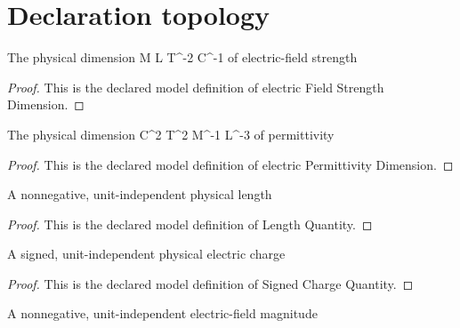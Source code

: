 \section{Declaration topology}
\begin{definition}
  \label{def:physics:phyx-mini-0852:phyxminiproblems-problemphyxmini0852-electricfieldstrengthdimension}
  The physical dimension M L T\textasciicircum{}-2 C\textasciicircum{}-1 of electric-field strength
\end{definition}
\begin{proof}
  This is the declared model definition of electric Field Strength Dimension.
\end{proof}
\begin{definition}
  \label{def:physics:phyx-mini-0852:phyxminiproblems-problemphyxmini0852-electricpermittivitydimension}
  The physical dimension C\textasciicircum{}2 T\textasciicircum{}2 M\textasciicircum{}-1 L\textasciicircum{}-3 of permittivity
\end{definition}
\begin{proof}
  This is the declared model definition of electric Permittivity Dimension.
\end{proof}
\begin{definition}
  \label{def:physics:phyx-mini-0852:phyxminiproblems-problemphyxmini0852-lengthquantity}
  A nonnegative, unit-independent physical length
\end{definition}
\begin{proof}
  This is the declared model definition of Length Quantity.
\end{proof}
\begin{definition}
  \label{def:physics:phyx-mini-0852:phyxminiproblems-problemphyxmini0852-signedchargequantity}
  A signed, unit-independent physical electric charge
\end{definition}
\begin{proof}
  This is the declared model definition of Signed Charge Quantity.
\end{proof}
\begin{definition}
  \label{def:physics:phyx-mini-0852:phyxminiproblems-problemphyxmini0852-electricfieldmagnitudequantity}
  A nonnegative, unit-independent electric-field magnitude
\end{definition}
